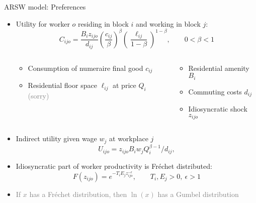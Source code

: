 \documentclass[11pt,notes=hide,aspectratio=169]{beamer}
\begin{document}
\begin{frame}{ARSW model: Preferences }
\begin{itemize}
\item Utility for worker $o$ residing in block $i$ and working in block $j$:
\begin{equation*}
C_{ijo} = \frac{B_{i} z_{ijo}}{d_{ij}}
\left( \frac{c_{ij}}{\beta} \right)^{\beta } \left( \frac{\ell
_{ij }}{1-\beta} \right)^{1-\beta },\qquad 0<\beta <1
\end{equation*}
\vspace{-5mm}
\begin{columns}
\begin{column}{0.50\textwidth}
\begin{itemize}
\item Consumption of numeraire final good $c_{ij}$
\item Residential floor space $\ell_{ij}$ at price $Q_{i}$ \textcolor{gray}{(sorry)}
\end{itemize}
\end{column}
\begin{column}{0.40\textwidth}
\begin{itemize}
\item Residential amenity $B_{i}$
\item Commuting costs $d_{ij}$
\item Idiosyncratic shock $z_{ijo}$ 
\end{itemize}
\end{column}
\end{columns}
\item Indirect utility given wage $w_j$ at workplace $j$
\begin{equation*}
U_{ijo} = z_{ijo} B_{i} w_{j} Q_{i}^{\beta-1} / d_{ij},
\end{equation*}
\item Idiosyncratic part of worker productivity is Fr\'{e}chet distributed:
\begin{equation*}
F(z_{ijo})=e^{-T_{i} E_{j} z_{ijo}^{-\epsilon }},\qquad T_{i}, E_{j} >0,\ \epsilon >1
\end{equation*}
\item[] \textcolor{gray}{If $x$ has a Fr\'{e}chet distribution, then $\ln(x)$ has a Gumbel distribution}
\end{itemize}
\end{frame}
\end{document}
